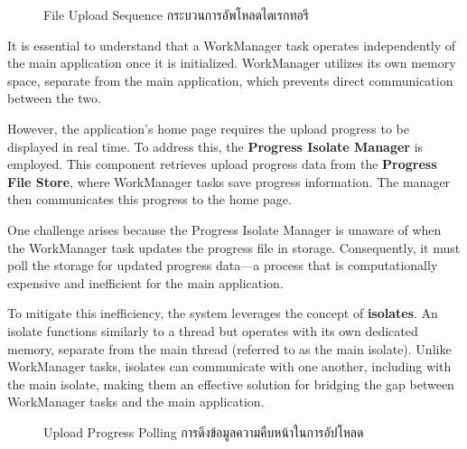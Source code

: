 \begin{figure}[h]
    \begin{center}
    
    \end{center}
    \newcommand{\DirectoryUploadSequence}{\ifenglish File Upload Sequence \else กระบวนการอัพโหลดไดเรกทอรี  \fi}
    \caption[\DirectoryUploadSequence]{\DirectoryUploadSequence}
    \label{fig directory upload quence}
\end{figure}


It is essential to understand that a WorkManager task operates independently of the main application once it is initialized. WorkManager utilizes its own memory space, separate from the main application, which prevents direct communication between the two.

However, the application's home page requires the upload progress to be displayed in real time. To address this, the \textbf{Progress Isolate Manager} is employed. This component retrieves upload progress data from the \textbf{Progress File Store}, where WorkManager tasks save progress information. The manager then communicates this progress to the home page.

One challenge arises because the Progress Isolate Manager is unaware of when the WorkManager task updates the progress file in storage. Consequently, it must poll the storage for updated progress data—a process that is computationally expensive and inefficient for the main application.

To mitigate this inefficiency, the system leverages the concept of \textbf{isolates}. An isolate functions similarly to a thread but operates with its own dedicated memory, separate from the main thread (referred to as the main isolate). Unlike WorkManager tasks, isolates can communicate with one another, including with the main isolate, making them an effective solution for bridging the gap between WorkManager tasks and the main application.


\begin{figure}[h]
    \begin{center}
    
    \end{center}
    \newcommand{\UploadProgressPolling}{\ifenglish Upload Progress Polling \else การดึงข้อมูลความคืบหน้าในการอัปโหลด \fi}
    \caption[\UploadProgressPolling]{\UploadProgressPolling}
    \label{fig directory upload quence}
\end{figure}

